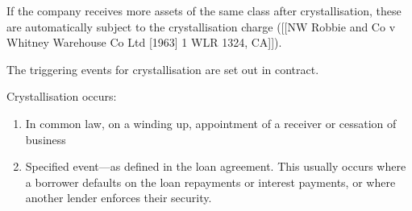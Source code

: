 \documentclass[
]{article}
\providecommand{\tightlist}{%
  \setlength{\itemsep}{0pt}\setlength{\parskip}{0pt}}
\begin{document}
If the company receives more assets of the same class after
crystallisation, these are automatically subject to the crystallisation
charge ({[}{[}NW Robbie and Co v Whitney Warehouse Co Ltd {[}1963{]} 1
WLR 1324, CA{]}{]}).

The triggering events for crystallisation are set out in contract.

Crystallisation occurs:

\begin{enumerate}
\def\labelenumi{\arabic{enumi}.}
\tightlist
\item
  In common law, on a winding up, appointment of a receiver or cessation
  of business
\item
  Specified event---as defined in the loan agreement. This usually
  occurs where a borrower defaults on the loan repayments or interest
  payments, or where another lender enforces their security.
\end{enumerate}
\end{document}
